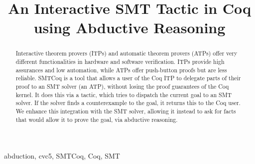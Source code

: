 \documentclass[conference]{IEEEtran}
\begin{document}
\title{An Interactive SMT Tactic in Coq using Abductive Reasoning}

\author{
\and
{}
\and
{}
}

\maketitle

\begin{abstract}
  Interactive theorem provers (ITPs) and 
  automatic theorem provers (ATPs) offer 
  very different functionalities in 
  hardware and software verification. ITPs
  provide high assurances and low automation,
  while ATPs offer push-button proofs but are 
  less reliable. SMTCoq is a tool that allows 
  a user of the Coq ITP to delegate parts of 
  their proof to an SMT solver (an ATP), 
  without losing the proof guarantees of 
  the Coq kernel. It does this via a
  tactic, which tries to dispatch the current
  goal to an SMT solver. If the solver finds 
  a counterexample to the goal, it returns 
  this to the Coq user. We enhance this 
  integration with the SMT solver, allowing
  it instead to ask for facts that would 
  allow it to prove the goal, via abductive
  reasoning.
\end{abstract}

\begin{IEEEkeywords}
abduction, cvc5, SMTCoq, Coq, SMT
\end{IEEEkeywords}
\end{document}
